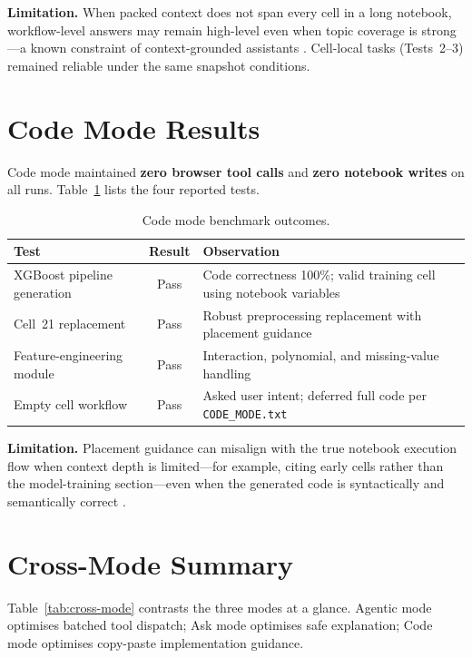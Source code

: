 \textbf{Limitation.} When packed context does not span every cell in a long notebook, workflow-level answers may remain high-level even when topic coverage is strong---a known constraint of context-grounded assistants \parencite{lewis2020rag,wei2022chain}. Cell-local tasks (Tests~2--3) remained reliable under the same snapshot conditions.

\section{Code Mode Results}

Code mode maintained \textbf{zero browser tool calls} and \textbf{zero notebook writes} on all runs. Table~\ref{tab:code-results} lists the four reported tests.

\begin{table}[!ht]
\centering
\caption{Code mode benchmark outcomes.}
\label{tab:code-results}
\small
\begin{tabular}{|p{3.6cm}|c|p{5.6cm}|}
\hline
\textbf{Test} & \textbf{Result} & \textbf{Observation} \\ \hline
XGBoost pipeline generation & Pass & Code correctness 100\%; valid training cell using notebook variables \\
Cell~21 replacement & Pass & Robust preprocessing replacement with placement guidance \\
Feature-engineering module & Pass & Interaction, polynomial, and missing-value handling \\
Empty cell workflow & Pass & Asked user intent; deferred full code per \texttt{CODE\_MODE.txt} \\ \hline
\end{tabular}
\end{table}

\textbf{Limitation.} Placement guidance can misalign with the true notebook execution flow when context depth is limited---for example, citing early cells rather than the model-training section---even when the generated code is syntactically and semantically correct \parencite{mozannar2024reading,mcnutt2023notebookassistants}.

\section{Cross-Mode Summary}

Table~\ref{tab:cross-mode} contrasts the three modes at a glance. Agentic mode optimises batched tool dispatch; Ask mode optimises safe explanation; Code mode optimises copy-paste implementation guidance.

